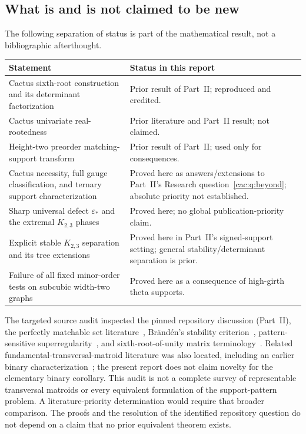 \documentclass[11pt]{article}
\numberwithin{equation}{section}
\theoremstyle{definition}
\newcommand{\epsstar}{\varepsilon_*}
\begin{document}
\subsection{What is and is not claimed to be new}
The following separation of status is part of the mathematical result, not a bibliographic afterthought.
\begin{center}
\small
\begin{tabularx}{\textwidth}{@{}p{}X@{}}\toprule
Statement & Status in this report\\\midrule
Cactus sixth-root construction and its determinant factorization & Prior result of Part~II; reproduced and credited.\\
Cactus univariate real-rootedness & Prior literature and Part~II result; not claimed.\\
Height-two preorder matching-support transform & Prior result of Part~II; used only for consequences.\\
Cactus necessity, full gauge classification, and ternary support characterization & Proved here as answers/extensions to Part~II's Research question~\ref{cac:q:beyond}; absolute priority not established.\\
Sharp universal defect $\epsstar$ and the extremal $K_{2,3}$ phases & Proved here; no global publication-priority claim.\\
Explicit stable $K_{2,3}$ separation and its tree extensions & Proved here in Part~II's signed-support setting; general stability/determinant separation is prior.\\
Failure of all fixed minor-order tests on subcubic width-two graphs & Proved here as a consequence of high-girth theta supports.\\\bottomrule
\end{tabularx}
\end{center}

The targeted source audit inspected the pinned repository discussion (Part~II), the perfectly matchable set literature~\cite{OT21,DK}, Br\"and\'en's stability criterion~\cite{Branden}, pattern-sensitive superregularity~\cite{ANP}, and sixth-root-of-unity matrix terminology~\cite{BDZ}. Related fundamental-transversal-matroid literature was also located, including an earlier binary characterization~\cite{Nakamura}; the present report does not claim novelty for the elementary binary corollary. This audit is not a complete survey of representable transversal matroids or every equivalent formulation of the support-pattern problem. A literature-priority determination would require that broader comparison. The proofs and the resolution of the identified repository question do not depend on a claim that no prior equivalent theorem exists.
\end{document}
